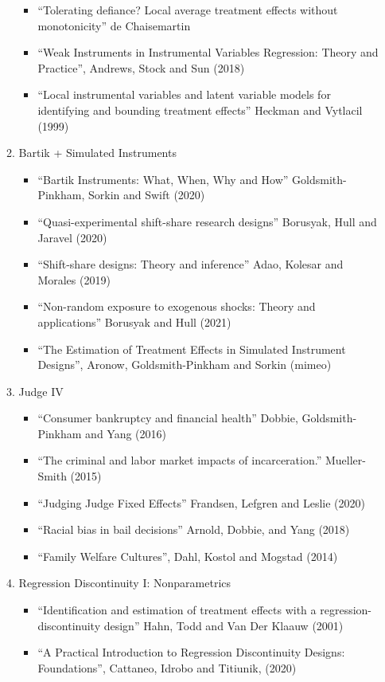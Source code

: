 \documentclass[11pt, a4paper]{article}
\begin{document}
\begin{enumerate}
\begin{enumerate}
\begin{itemize}
    \item ``Tolerating defiance? Local average treatment effects without monotonicity'' de Chaisemartin
    \item ``Weak Instruments in Instrumental Variables Regression: Theory and Practice'', Andrews, Stock and Sun (2018)
    \item ``Local instrumental variables and latent variable models
      for identifying and bounding treatment effects'' Heckman and
      Vytlacil (1999)
    \end{itemize}
  \item Bartik + Simulated Instruments
    \begin{itemize}
    \item ``Bartik Instruments: What, When, Why and How'' Goldsmith-Pinkham, Sorkin and Swift (2020)
    \item ``Quasi-experimental shift-share research designs'' Borusyak, Hull and Jaravel (2020)
    \item ``Shift-share designs: Theory and inference'' Adao, Kolesar and Morales (2019)
    \item ``Non-random exposure to exogenous shocks: Theory and applications'' Borusyak and Hull (2021)
    \item ``The Estimation of Treatment Effects in Simulated Instrument Designs'', Aronow, Goldsmith-Pinkham and Sorkin (mimeo) 
    \end{itemize}
  \item Judge IV
    \begin{itemize}
    \item ``Consumer bankruptcy and financial health'' Dobbie, Goldsmith-Pinkham and Yang (2016)
    \item ``The criminal and labor market impacts of incarceration.'' Mueller-Smith (2015)
    \item ``Judging Judge Fixed Effects'' Frandsen, Lefgren and Leslie (2020)
    \item ``Racial bias in bail decisions'' Arnold, Dobbie, and Yang (2018)
    \item ``Family Welfare Cultures'', Dahl, Kostol and Mogstad (2014)
    \end{itemize}
  \item Regression Discontinuity I: Nonparametrics
    \begin{itemize}
    \item ``Identification and estimation of treatment effects with a regression-discontinuity design'' Hahn, Todd and Van Der Klaauw (2001)
    \item ``A Practical Introduction to Regression Discontinuity Designs: Foundations'', Cattaneo, Idrobo and Titiunik, (2020)

\end{itemize}
\end{enumerate}
\end{enumerate}
\end{document}

